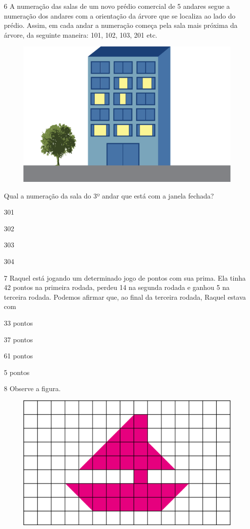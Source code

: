 \num{6} A numeração das salas de um novo prédio comercial de 5 andares segue a
numeração dos andares com a orientação da árvore que se localiza ao
lado do prédio. Assim, em cada andar a numeração começa pela sala mais
próxima da árvore, da seguinte maneira: 101, 102, 103, 201 etc.

\begin{figure}[htpb!]
\centering
\includegraphics[width=.5\textwidth]{./media/image93.png}
\end{figure}

Qual a numeração da sala do 3º andar que está com a janela fechada?

\begin{escolha}
\item
  301
\item
  302
\item
  303
\item
  304
\end{escolha}

\num{7} Raquel está jogando um determinado jogo de pontos com sua prima. Ela
tinha 42 pontos na primeira rodada, perdeu 14 na segunda rodada e ganhou
5 na terceira rodada. Podemos afirmar que, ao final da terceira rodada, Raquel estava com

\begin{escolha}
\item
  33 pontos
\item
  37 pontos
\item
  61 pontos
\item
  5 pontos
\end{escolha}

\num{8} Observe a figura.

\begin{figure}[htpb!]
\centering
\includegraphics[width=.6\textwidth]{./media/image94.png}
\end{figure}

